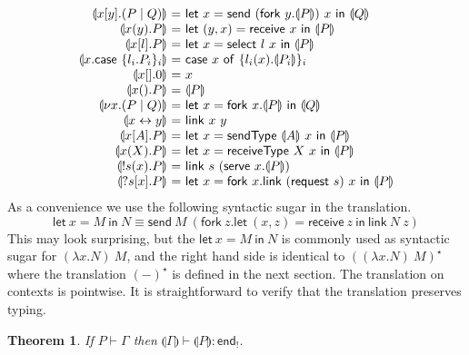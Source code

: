 \documentclass{easychair}
\makeatletter
\newtheorem{theorem}{Theorem}
\newcommand{\ba}{\begin{array}}
\newcommand{\ea}{\end{array}}
\newenvironment{equations}{\[\ba{@{}r@{~}c@{~}l@{}}}{\ea\]}
\newenvironment{eqs}{\ba{@{}r@{~}c@{~}l@{}}}{\ea}
\newcommand{\key}{\mathsf}
\newcommand{\set}[1]{\{ #1 \}}
\newcommand{\cptogv}[1]{\llparenthesis{#1}\rrparenthesis}
\newcommand{\row}[2]{\set{#1}_{#2}}
\newcommand{\gvEndOutput}{\key{end}_!}
\newcommand{\cpj}[2]{{#1} \vdash {#2}}
\newcommand{\gvj}[3]{{#1} \vdash {#2} : {#3}}
\newcommand{\la}{l}
\newcommand{\G}{\Gamma}
\newcommand{\gvLink}[2]{\key{link}~{#1}~{#2}}
\newcommand{\gvLam}[2]{\lambda {#1}.{#2}}
\newcommand{\gvApp}[2]{{#1}~{#2}}
\newcommand{\gvPair}[2]{({#1},{#2})}
\newcommand{\gvLet}[3]{\key{let}~{#1}={#2}~\key{in}~{#3}}
\newcommand{\gvSend}[2]{\key{send}~{#1}~{#2}}
\newcommand{\gvReceive}[1]{\key{receive}~{#1}}
\newcommand{\gvSelect}[2]{\key{select}~{#1}~{#2}}
\newcommand{\gvCase}[2]{\key{case}~{#1}~\key{of}~{#2}}
\newcommand{\gvFork}[2]{\key{fork}~{#1}.{#2}}
\newcommand{\gvTerminate}[1]{\key{terminate}~{#1}}
\newcommand{\gvReceiveK}[4]{\gvLet{\gvPair{#1}{#2}}{\gvReceive{#3}}{#4}}
\newcommand{\gvSendType}[2]{\key{sendType}~{#1}~{#2}}
\newcommand{\gvReceiveType}[2]{\key{receiveType}~{#1}~{#2}}
\newcommand{\gvServe}[2]{\key{serve}~{#1}.{#2}}
\newcommand{\gvRequest}[1]{\key{request}~{#1}}
\newcommand{\cpLink}[2]{{#1} \leftrightarrow {#2}}
\newcommand{\cpCut}[3]{\nu {#1}.({#2} \mid {#3})}
\newcommand{\cpOutput}[4]{{#1}[{#2}].({#3} \mid {#4})}
\newcommand{\cpInput}[3]{{#1}({#2}).{#3}}
\newcommand{\cpInject}[3]{{#1}[{#2}].{#3}}
\newcommand{\cpCase}[2]{{#1}.\key{case}~{#2}}
\newcommand{\cpServe}[3]{!{#1}({#2}).{#3}}
\newcommand{\cpRequest}[3]{?{#1}[{#2}].{#3}}
\newcommand{\cpEmptyOut}[1]{{#1}[].0}
\newcommand{\cpEmptyIn}[2]{{#1}().{#2}}
\newcommand{\cpSendType}[3]{{#1}[{#2}].{#3}}
\newcommand{\cpReceiveType}[3]{{#1}({#2}).{#3}}
\newcommand{\lampi}[1]{({#1})^\star}
\makeatother
\begin{document}
\[
\begin{eqs}
\cptogv{\cpOutput{x}{y}{P}{Q}} &=&
  \gvLet{x}{\gvSend{(\gvFork{y}{\cptogv{P}})}{x}}{\cptogv{Q}} \\
\cptogv{\cpInput{x}{y}{P}} &=&
  \gvLet{\gvPair{y}{x}}{\gvReceive{x}}{\cptogv{P}} \\
\cptogv{\cpInject{x}{\la}{P}} &=&
  \gvLet{x}{\gvSelect{\la}{x}}{\cptogv{P}} \\
\cptogv{\cpCase{x}{\row{\la_i.P_i}{i}}} &=&
  \gvCase{x}{\row{\la_i(x).\cptogv{P_i}}{i}} \\
\cptogv{\cpEmptyOut{x}} &=& x \\
\cptogv{\cpEmptyIn{x}{P}} &=& \cptogv{P} \\
\cptogv{\cpCut{x}{P}{Q}} &=&
  \gvLet{x}{\gvFork{x}{\cptogv{P}}}{\cptogv{Q}} \\
\cptogv{\cpLink{x}{y}} &=& \gvLink{x}{y} \\

\cptogv{\cpSendType{x}{A}{P}} &=&
  \gvLet{x}{\gvSendType{\cptogv{A}}{x}}{\cptogv{P}} \\
\cptogv{\cpReceiveType{x}{X}{P}} &=&
  \gvLet{x}{\gvReceiveType{X}{x}}{\cptogv{P}} \\

\cptogv{\cpServe{s}{x}{P}} &=&
  \gvLink{s}{(\gvServe{x}{\cptogv{P}})} \\
\cptogv{\cpRequest{s}{x}{P}} &=&
  \gvLet{x}{\gvFork{x}{\gvLink{(\gvRequest{s})}{x}}}{\cptogv{P}} \\
\end{eqs}
\]
%
As a convenience we use the following syntactic sugar in the translation.
\[
\gvLet{x}{M}{N} \equiv \gvSend{M}{(\gvFork{z}{\gvReceiveK{x}{z}{z}{\gvLink{N}{z}}})}
\]
This may look surprising, but the $\gvLet{x}{M}{N}$ is commonly used as syntactic sugar for
$\gvApp{(\gvLam{x}{N})}{M}$, and the right hand side is identical to
$\lampi{\gvApp{(\gvLam{x}{N})}{M}}$ where the translation $\lampi{-}$ is defined in the next
section.
%
%
The translation on contexts is pointwise.
It is straightforward to verify that the translation preserves typing.
\begin{theorem}
If $\cpj{P}{\G}$ then $\gvj{\cptogv{\G}}{\cptogv{P}}{\gvEndOutput}$.
\end{theorem}
\end{document}
